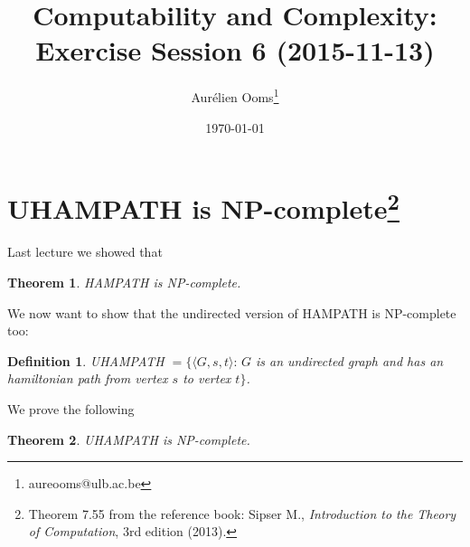 \documentclass{article}
\title{Computability and Complexity:\\Exercise Session 6 (2015-11-13)}
\author{Aurélien Ooms\footnote{aureooms@ulb.ac.be}}
\date{\today}
\newcommand{\theoremname}{Theorem}
\newcommand{\definitionname}{Definition}
\newtheorem{theorem}{\theoremname}
\newtheorem{definition}{\definitionname}
\newcommand{\st}{\colon\,}
\begin{document}
\maketitle
\tableofcontents

\section{UHAMPATH is NP-complete\footnote{%
Theorem 7.55 from the reference book: Sipser M.,
\emph{Introduction to the Theory of Computation}, 3rd edition (2013).}}

Last lecture we showed that
\begin{theorem}
	HAMPATH is NP-complete.
\end{theorem}
We now want to show that the undirected version of HAMPATH is NP-complete too:
\begin{definition}
	UHAMPATH \(= \{\langle G, s, t\rangle \st G\) is an undirected
				graph and has an hamiltonian path from vertex \(s\) to vertex
	\(t\}\).
\end{definition}
We prove the following
\begin{theorem}
	UHAMPATH is NP-complete.
\end{theorem}
\end{document}
